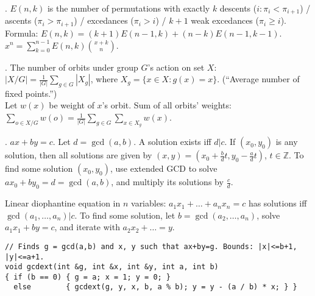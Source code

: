 
.
$E(n,k)$ is the number of permutations with exactly
$k$ descents ($i: \pi_i < \pi_{i+1}$) /
ascents ($\pi_i > \pi_{i+1}$) /
excedances ($\pi_i > i$) /
$k+1$ weak excedances ($\pi_i \ge i$). \\
Formula: $E(n,k)=(k+1)E(n-1,k)+(n-k)E(n-1,k-1)$. \quad
$x^n = \sum_{k=0}^{n-1} E(n,k) {x+k \choose n}$.

.
The number of orbits under group $G$'s action on set $X$:\\
$|X/G| = \frac{1}{|G|} \sum_{g \in G} |X_g|$,
where $X_g=\{ x \in X: g(x)=x \}$. (``Average number of fixed points.'') \\
Let $w(x)$ be weight of $x$'s orbit. Sum of all orbits' weights:
$\sum_{o \in X/G} w(o) = \frac{1}{|G|} \sum_{g \in G} \sum_{x \in X_g} w(x)$.





. $ax+by=c$.
Let $d=\gcd(a,b)$. A solution exists iff $d|c$.
If $(x_0,y_0)$ is any solution, then all solutions are given by
$(x,y) = (x_0 + \frac{b}{d}t, y_0 - \frac{a}{d}t)$, $t \in {\mathbb Z}$.
To find some solution $(x_0, y_0)$, use extended GCD to solve
$ax_0 + by_0 = d = \gcd(a, b)$, and multiply its solutions by $\frac{c}{d}$.

Linear diophantine equation in $n$ variables:
$a_1 x_1 + \dots + a_n x_n = c$ has solutions iff $\gcd(a_1, \dots, a_n) | c$.
To find some solution, let $b=\gcd(a_2, \dots, a_n)$,
solve $a_1 x_1 + by = c$, and iterate with $a_2 x_2 + \dots = y$.

\vspace{-5mm}
\begin{verbatim}
// Finds g = gcd(a,b) and x, y such that ax+by=g. Bounds: |x|<=b+1, |y|<=a+1.
void gcdext(int &g, int &x, int &y, int a, int b)
{ if (b == 0) { g = a; x = 1; y = 0; }
  else        { gcdext(g, y, x, b, a % b); y = y - (a / b) * x; } }
\end{verbatim}
\vspace{-3mm}

